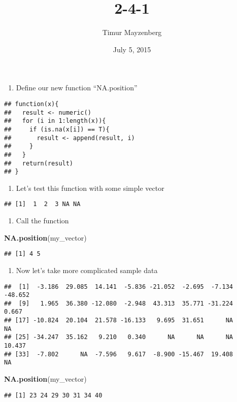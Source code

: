 \documentclass[]{article}
\title{2-4-1}
\author{Timur Mayzenberg}
\date{July 5, 2015}
\newenvironment{Shaded}{\begin{snugshade}}{\end{snugshade}}
\newcommand{\KeywordTok}[1]{\textcolor[rgb]{0.13,0.29,0.53}{\textbf{{#1}}}}
\newcommand{\NormalTok}[1]{{#1}}
\begin{document}
\maketitle


\begin{enumerate}
\def\labelenumi{\arabic{enumi}.}
\itemsep1pt\parskip0pt
\item
  Define our new function ``NA.position''
\end{enumerate}

\begin{verbatim}
## function(x){
##   result <- numeric()
##   for (i in 1:length(x)){
##     if (is.na(x[i]) == T){
##       result <- append(result, i)
##     }
##   }
##   return(result)
## }
\end{verbatim}

\begin{enumerate}
\def\labelenumi{\arabic{enumi}.}
\setcounter{enumi}{1}
\itemsep1pt\parskip0pt
\item
  Let's test this function with some simple vector
\end{enumerate}

\begin{verbatim}
## [1]  1  2  3 NA NA
\end{verbatim}

\begin{enumerate}
\def\labelenumi{\arabic{enumi}.}
\setcounter{enumi}{2}
\itemsep1pt\parskip0pt
\item
  Call the function
\end{enumerate}

\begin{Shaded}
\begin{Highlighting}[]
\KeywordTok{NA.position}\NormalTok{(my_vector)}
\end{Highlighting}
\end{Shaded}

\begin{verbatim}
## [1] 4 5
\end{verbatim}

\begin{enumerate}
\def\labelenumi{\arabic{enumi}.}
\setcounter{enumi}{3}
\itemsep1pt\parskip0pt
\item
  Now let's take more complicated sample data
\end{enumerate}

\begin{verbatim}
##  [1]  -3.186  29.085  14.141  -5.836 -21.052  -2.695  -7.134 -48.652
##  [9]   1.965  36.380 -12.080  -2.948  43.313  35.771 -31.224   0.667
## [17] -10.824  20.104  21.578 -16.133   9.695  31.651      NA      NA
## [25] -34.247  35.162   9.210   0.340      NA      NA      NA  10.437
## [33]  -7.802      NA  -7.596   9.617  -8.900 -15.467  19.408      NA
\end{verbatim}

\begin{Shaded}
\begin{Highlighting}[]
\KeywordTok{NA.position}\NormalTok{(my_vector)}
\end{Highlighting}
\end{Shaded}

\begin{verbatim}
## [1] 23 24 29 30 31 34 40
\end{verbatim}
\end{document}
